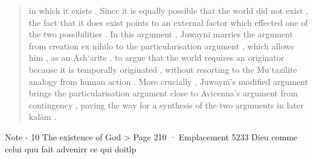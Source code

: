 \begin{quote}
in which it exists . Since it is equally possible that the world did not exist , the fact that it does exist points to an external factor which effected one of the two possibilities . In this argument , Juwaynī marries the argument from creation ex nihilo to the particularisation argument , which allows him , as an Ash‘arite , to argue that the world requires an originator because it is temporally originated , without resorting to the Mu‘tazilite analogy from human action . More crucially , Juwaynī’s modified argument brings the particularisation argument close to Avicenna’s argument from contingency , paving the way for a synthesis of the two arguments in later kalām .
\end{quote} 

\begin{Synthesis}
Note - 10 The existence of God > Page 210 · Emplacement 5233
Dieu comme celui quu fait advenirr ce qui doitlp
\end{Synthesis}
